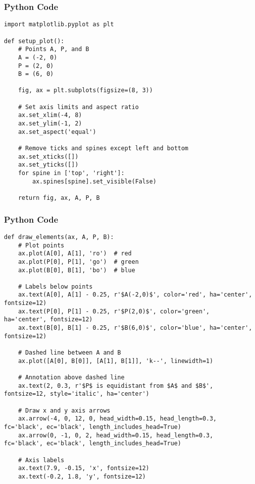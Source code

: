 \documentclass{beamer}
\begin{document}
\begin{frame}[fragile]
    \frametitle{Python Code}
    \begin{lstlisting}
import matplotlib.pyplot as plt

def setup_plot():
    # Points A, P, and B
    A = (-2, 0)
    P = (2, 0)
    B = (6, 0)

    fig, ax = plt.subplots(figsize=(8, 3))

    # Set axis limits and aspect ratio
    ax.set_xlim(-4, 8)
    ax.set_ylim(-1, 2)
    ax.set_aspect('equal')

    # Remove ticks and spines except left and bottom
    ax.set_xticks([])
    ax.set_yticks([])
    for spine in ['top', 'right']:
        ax.spines[spine].set_visible(False)

    return fig, ax, A, P, B

\end{lstlisting}
\end{frame}

\begin{frame}[fragile]
    \frametitle{Python Code}
    \begin{lstlisting}
def draw_elements(ax, A, P, B):
    # Plot points
    ax.plot(A[0], A[1], 'ro')  # red
    ax.plot(P[0], P[1], 'go')  # green
    ax.plot(B[0], B[1], 'bo')  # blue

    # Labels below points
    ax.text(A[0], A[1] - 0.25, r'$A(-2,0)$', color='red', ha='center', fontsize=12)
    ax.text(P[0], P[1] - 0.25, r'$P(2,0)$', color='green', ha='center', fontsize=12)
    ax.text(B[0], B[1] - 0.25, r'$B(6,0)$', color='blue', ha='center', fontsize=12)

    # Dashed line between A and B
    ax.plot([A[0], B[0]], [A[1], B[1]], 'k--', linewidth=1)

    # Annotation above dashed line
    ax.text(2, 0.3, r'$P$ is equidistant from $A$ and $B$', fontsize=12, style='italic', ha='center')

    # Draw x and y axis arrows
    ax.arrow(-4, 0, 12, 0, head_width=0.15, head_length=0.3, fc='black', ec='black', length_includes_head=True)
    ax.arrow(0, -1, 0, 2, head_width=0.15, head_length=0.3, fc='black', ec='black', length_includes_head=True)

    # Axis labels
    ax.text(7.9, -0.15, 'x', fontsize=12)
    ax.text(-0.2, 1.8, 'y', fontsize=12)

\end{lstlisting}
\end{frame}
\end{document}
